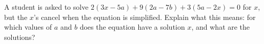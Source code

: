 A student is asked to solve $2(3x-5a)+9(2a-7b)+3(5a-2x)=0$ for $x$, but the $x$'s cancel when the equation is simplified. Explain what this means: for which values of $a$ and $b$ does the equation have a solution $x$, and what are the solutions?
